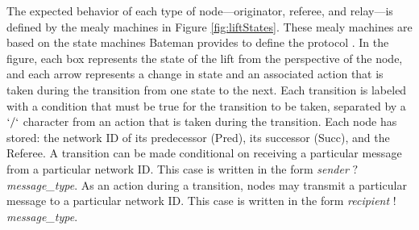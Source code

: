 \documentclass[runningheads]{llncs}
\newcommand{\figref}[1]{Figure \ref{#1}}
\newif\ifcomments
\newif\ifkylecomments
\newcommand{\egm}[1]{\ifcomments\textcolor{orange}{egm: #1}\fi}
\newcommand{\krs}[1]{\ifkylecomments\textcolor{blue}{krs: #1}\fi}
\begin{document}
The expected behavior of each type of node---originator, referee, and relay---is defined by the mealy machines in \figref{fig:liftStates}.
These mealy machines are based on the state machines Bateman provides to define the protocol \cite{bateman_state_machines}.
In the figure, each box represents the state of the lift from the perspective of the node, and each arrow represents a change in state and an associated action that is taken during the transition from one state to the next. Each transition is labeled with a condition that must be true for the transition to be taken, separated by a $`/`$ character from an action that is taken during the transition. Each node has stored: the network ID of its predecessor (Pred), its successor (Succ), and the Referee. A transition can be made conditional on receiving a particular message from a particular network ID. This case is written in the form \emph{sender} $?$ \emph{message\_type}. As an action during a transition, nodes may transmit a particular message to a particular network ID. This case is written in the form \emph{recipient} $!$ \emph{message\_type}. 

\krs{Below is a shot at this. Is this convincing enough?
\egm{Maybe rework the following paragraph to state that the Mealy machines define the behavior of each role that is used for verification in the following sections. Here I would be tempted to make clear any differences from the state machines and the actual verification models if any. Leave the section references as you have them. Also, create some macros called \textbackslash figref and \textbackslash secref that create the section and figure references. See any of my papers for an example.}
\krs{We don't talk about ignoring PEND messages, but I think it just distracts from the message. We can probably omit it. Folks might ask because it is in the Mealy Machines}
\egm{In the section on the mealy machines, I suggest the addition of a closing paragraph that states what is different in the verification models and why such a change is inconsequential to the verification result. It is in that paragraph that I would make clear why the pending messages are not relevant.}}
\end{document}
